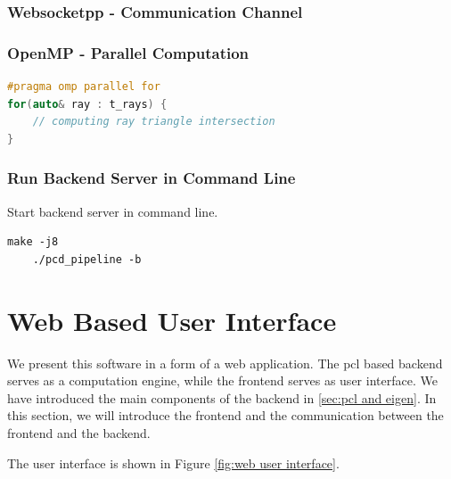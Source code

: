 \documentclass[11pt, a4paper,oneside,chapterprefix=false]{scrbook}
\begin{document}
\subsubsection{Websocketpp - Communication Channel} \label{subsec:websocketpp}

\subsubsection{OpenMP - Parallel Computation} \label{subsec:openmp}
\begin{lstlisting}[language=C++, caption=Region Growing]
#pragma omp parallel for
for(auto& ray : t_rays) {
	// computing ray triangle intersection
}
\end{lstlisting}

\subsubsection{Run Backend Server in Command Line} \label{subsec:backend command line}

Start backend server in command line.

\begin{lstlisting}[style=terminal]
	make -j8
	./pcd_pipeline -b
\end{lstlisting}

\section{Web Based User Interface} \label{sec:three.js}

We present this software in a form of a web application. The pcl based backend serves as a computation engine, while the frontend serves as user interface. We have introduced the main components of the backend in \ref{sec:pcl and eigen}. In this section, we will introduce the frontend and the communication between the frontend and the backend. 

The user interface is shown in Figure \ref{fig:web user interface}. 
\end{document}

